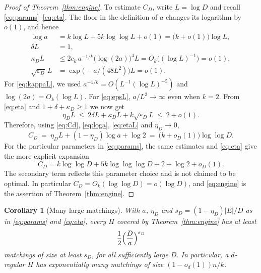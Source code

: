 \documentclass[10pt,a4paper]{amsart}
\newtheorem{corollary}[theorem]{Corollary}
\newcommand{\EE}{E}
\begin{document}
\begin{proof}[Proof of Theorem~\ref{thm:engine}]
To estimate $C_D$, write $L=\log D$ and recall \eqref{eq:params}--\eqref{eq:eta}.
The floor in the definition of $a$ changes its logarithm by $o(1)$, and hence
\begin{align}
  \log a
    &=k\log L+5k\log\log L+o(1)
      =\bigl(k+o(1)\bigr)\log L, \label{eq:loga}\\
  \delta L&=1, \label{eq:deltaL}\\
  \kappa_D L
    &\le 2c_k\,a^{-1/k}\bigl(\log(2a)\bigr)^4L
      =O_k\bigl((\log L)^{-1}\bigr)=o(1), \label{eq:kappaL}\\
  \sqrt{\varepsilon_D}\,L
    &=\exp\bigl(-a/(48L^2)\bigr)L=o(1). \label{eq:epsL}
\end{align}
For \eqref{eq:kappaL}, we used
$a^{-1/k}=O(L^{-1}(\log L)^{-5})$ and $\log(2a)=O_k(\log L)$. For
\eqref{eq:epsL}, $a/L^2\to\infty$ even when $k=2$. From \eqref{eq:eta} and
$1+\delta+\kappa_D\ge1$ we now get
\begin{equation}
\label{eq:etaL}
  \eta_D L\ \le\ 2\delta L+\kappa_D L+k\sqrt{\varepsilon_D}L\ \le\ 2+o(1).
\end{equation}
Therefore, using \eqref{eq:Cd}, \eqref{eq:loga}, \eqref{eq:etaL} and $\eta_D\to0$,
\begin{equation}
\label{eq:Casymp}
  C_D\ =\ \eta_DL+(1-\eta_D)\log a+\log2
  \ =\ \bigl(k+o_D(1)\bigr)\log\log D .
\end{equation}
For the particular parameters in \eqref{eq:params}, the same estimates and
\eqref{eq:eta} give the more explicit expansion
\[
  C_D=k\log\log D+5k\log\log\log D+2+\log2+o_D(1).
\]
The secondary term reflects this parameter choice and is not claimed to be optimal.
In particular $C_D=O_k(\log\log D)=o(\log D)$, and \eqref{eq:engine} is the assertion of
Theorem~\ref{thm:engine}.
\end{proof}

\begin{corollary}[Many large matchings]
\label{cor:manylarge}
With $a$, $\eta_D$ and $s_D=(1-\eta_D)|\EE|/D$ as in
\eqref{eq:params} and \eqref{eq:eta}, every $H$ covered by
Theorem~\ref{thm:engine} has at least
\[
  \frac12\Bigl(\frac{D}{a}\Bigr)^{s_D}
\]
matchings of size at least $s_D$, for all sufficiently large $D$.
In particular, a $d$-regular $H$ has exponentially many matchings of size
$(1-o_d(1))n/k$.
\end{corollary}
\end{document}
